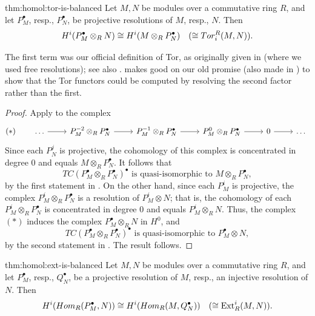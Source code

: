 \begin{thm}{}{thm:homol:tor-is-balanced}
  Let $M, N$ be modules over a commutative ring $R$, and let
  $P_M^\bullet$, resp., $P_N^\bullet$, be projective resolutions of
  $M$, resp., $N$. Then
  \[
    H^i(P_M^\bullet \otimes_R N) \cong H^i(M \otimes_R P_N^\bullet)
    \quad (\cong Tor^R_i(M, N)).
  \]
\end{thm}

The first term was our official definition of Tor, as originally given
in  (where we used free
resolutions); see also
.  makes good on our
old promise (also made in ) to
show that the Tor functors could be computed by resolving the second
factor rather than the first.

\begin{proof}
  Apply  to the complex
  \[
    (*) \qquad
    \begin{tikzcd}
      \dots \arrow[r] & P_M^{-2} \otimes_R P_N^\bullet \arrow[r] &
      P_M^{-1} \otimes_R P_N^\bullet \arrow[r] & P_M^0 \otimes_R
      P_N^\bullet \arrow[r] & 0 \arrow[r] & \dots
    \end{tikzcd}
  \]
  Since each $P_N^j$ is projective, the cohomology of this complex is
  concentrated in degree $0$ and equals $M \otimes_R P_N^\bullet$.  It
  follows that
  \[
    TC(P_M^\bullet \otimes_R P_N^\bullet)^\bullet \text{ is
      quasi-isomorphic to } M \otimes_R P_N^\bullet,
  \]
  by the first statement in . On the other
  hand, since each $P_M^i$ is projective, the complex
  $P_M^i \otimes_R P_N^\bullet$ is a resolution of $P_M^i \otimes N$;
  that is, the cohomology of each $P_M^i \otimes_R P_N^\bullet$ is
  concentrated in degree $0$ and equals $P_M^i \otimes_R N$. Thus, the
  complex $(*)$ induces the complex $P_M^\bullet \otimes_R N$ in
  $H^0$, and
  \[
    TC(P_M^\bullet \otimes_R P_N^\bullet)^\bullet \text{ is
      quasi-isomorphic to } P_M^\bullet \otimes N,
  \]
  by the second statement in . The result
  follows.
\end{proof}

\begin{thm}{}{thm:homol:ext-is-balanced}
  Let $M, N$ be modules over a commutative ring $R$, and let
  $P_M^\bullet$, resp., $Q_N^\bullet$, be a projective resolution of
  $M$, resp., an injective resolution of $N$. Then
  \[
    H^i(Hom_R(P_M^\bullet, N)) \cong H^i(Hom_R(M, Q_N^\bullet))
    \quad (\cong \operatorname{Ext}^i_R(M, N)).
  \]
\end{thm}

